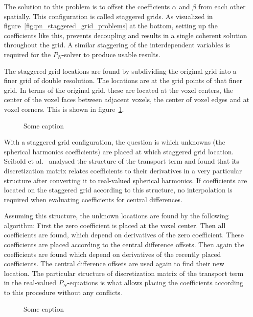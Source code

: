 The solution to this problem is to offset the coefficients $\alpha$ and $\beta$ from each other spatially. This configuration is called staggered grids. As visualized in figure~\ref{fig:pn_staggered_grid_problems} at the bottom, setting up the coefficients like this, prevents decoupling and results in a single coherent solution throughout the grid. A similar staggering of the interdependent variables is required for the $P_N$-solver to produce usable results.

The staggered grid locations are found by subdividing the original grid into a finer grid of double resolution. The locations are at the grid points of that finer grid. In terms of the original grid, these are located at the voxel centers, the center of the voxel faces between adjacent voxels, the center of voxel edges and at voxel corners. This is shown in figure~\ref{fig:staggered_grid}.
\begin{figure}[h]
\centering
{}
\caption{Some caption}
\label{fig:staggered_grid}
\end{figure}

With a staggered grid configuration, the question is which unknowns (the spherical harmonics coefficients) are placed at which staggered grid location. Seibold et al.~\cite{Seibold14} analysed the structure of the transport term and found that its discretization matrix relates coefficients to their derivatives in a very particular structure after converting it to real-valued spherical harmonics. If coefficients are located on the staggered grid according to this structure, no interpolation is required when evaluating coefficients for central differences.

Assuming this structure, the unknown locations are found by the following algorithm: First the zero coefficient is placed at the voxel center. Then all coefficients are found, which depend on derivatives of the zero coefficient. These coefficients are placed according to the central difference offsets. Then again the coefficients are found which depend on derivatives of the recently placed coefficients. The central difference offsets are used again to find their new location. The particular structure of discretization matrix of the transport term in the real-valued $P_N$-equations is what allows placing the coefficients according to this procedure without any conflicts. 
\begin{figure}[h]
\centering
{}
\caption{Some caption}
\label{fig:staggered_grid_placement}
\end{figure}

